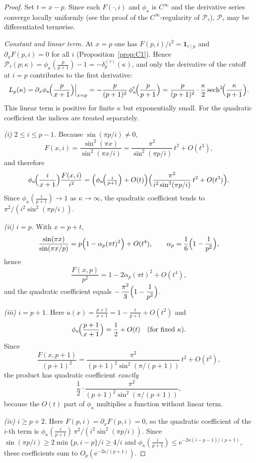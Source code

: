 \begin{proof}
Set $t=x-p$. Since each $F(\cdot,i)$ and $\phi_\kappa$ is $C^\infty$ and the derivative series converge locally uniformly (see the proof of the $C^\infty$-regularity of $\mathcal P_\tau$), $\mathcal P_\tau$ may be differentiated termwise.

\emph{Constant and linear term.} At $x=p$ one has $F(p,i)/i^2=\mathbf 1_{i\mid p}$ and $\partial_xF(p,i)=0$ for all $i$ (Proposition~\ref{prop:C1}). Hence $\mathcal P_\tau(p;\kappa)=\phi_\kappa(\tfrac{p}{p+1})-1=-\delta_p^{(\tau)}(\kappa)$, and only the derivative of the cutoff at $i=p$ contributes to the first derivative:
\[
L_p(\kappa)=\partial_x\phi_\kappa\!\Bigl(\frac{p}{x+1}\Bigr)\Big|_{x=p}=-\frac{p}{(p+1)^2}\,\phi_\kappa'\!\Bigl(\frac{p}{p+1}\Bigr)=\frac{p}{(p+1)^2}\cdot\frac{\kappa}{2}\,\mathrm{sech}^2\!\Bigl(\frac{\kappa}{p+1}\Bigr).
\]
This linear term is positive for finite $\kappa$ but exponentially small. For the quadratic coefficient the indices are treated separately.

\emph{(i) $2\le i\le p-1$.} Because $\sin(\pi p/i)\neq 0$,
\[
F(x,i)=\frac{\sin^2(\pi x)}{\sin^2(\pi x/i)}=\frac{\pi^2}{\sin^2(\pi p/i)}\,t^2+O(t^3),
\]
and therefore
\[
\phi_\kappa\!\Bigl(\frac{i}{x+1}\Bigr)\frac{F(x,i)}{i^2}
=\Bigl(\phi_\kappa\!\Bigl(\tfrac{i}{p+1}\Bigr)+O(t)\Bigr)\Bigl(\frac{\pi^2}{i^2\sin^2(\pi p/i)}\,t^2+O(t^3)\Bigr).
\]
Since $\phi_\kappa(\tfrac{i}{p+1})\to 1$ as $\kappa\to\infty$, the quadratic coefficient tends to $\pi^2/(i^2\sin^2(\pi p/i))$.

\emph{(ii) $i=p$.} With $x=p+t$,
\[
\frac{\sin(\pi x)}{\sin(\pi x/p)}=p\Bigl(1-\alpha_p(\pi t)^2\Bigr)+O(t^4),\qquad
\alpha_p=\frac{1}{6}\Bigl(1-\frac{1}{p^2}\Bigr),
\]
hence
\[
\frac{F(x,p)}{p^2}=1-2\alpha_p(\pi t)^2+O(t^4),
\]
and the quadratic coefficient equals $-\,\dfrac{\pi^2}{3}\Bigl(1-\dfrac{1}{p^2}\Bigr)$.

\emph{(iii) $i=p+1$.} Here $u(x)=\tfrac{p+1}{x+1}=1-\tfrac{t}{p+1}+O(t^2)$ and
\[
\phi_\kappa\!\Bigl(\frac{p+1}{x+1}\Bigr)=\frac12+O(t) \quad (\text{for fixed }\kappa).
\]
Since
\[
\frac{F(x,p+1)}{(p+1)^2}=\frac{\pi^2}{(p+1)^2\sin^2(\pi/(p+1))}\,t^2+O(t^3),
\]
the product has quadratic coefficient \emph{exactly}
\[
\frac{1}{2}\cdot\frac{\pi^2}{(p+1)^2\sin^2(\pi/(p+1))},
\]
because the $O(t)$ part of $\phi_\kappa$ multiplies a function without linear term.

\emph{(iv) $i\ge p+2$.} Here $F(p,i)=\partial_xF(p,i)=0$, so the quadratic coefficient of the $i$-th term is $\phi_\kappa(\tfrac{i}{p+1})\,\pi^2/(i^2\sin^2(\pi p/i))$. Since $\sin(\pi p/i)\ge 2\min\{p,i-p\}/i\ge 4/i$ and $\phi_\kappa(\tfrac{i}{p+1})\le \mathrm e^{-2\kappa(i-p-1)/(p+1)}$, these coefficients sum to $O_p(\mathrm e^{-2\kappa/(p+1)})$.


\end{proof}

